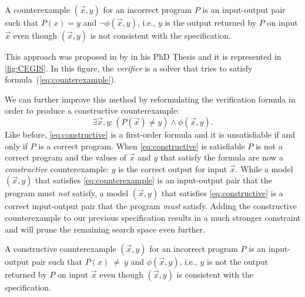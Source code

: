 \begin{definition}[Counterexample]
A counterexample \((\vec{x}, y)\) for an incorrect program \(P\) is an input-output pair such that \(P(x) = y\) and \(\neg \phi(\vec{x}, y)\), i.e., \(y\) is the output returned by \(P\) on input \(\vec{x}\) even though \((\vec{x}, y)\) is not consistent with the specification.
\end{definition}

This approach was proposed in \citeyear{Solar-LezamaPhDThesis} by \citeauthor{Solar-LezamaPhDThesis} in his PhD Thesis \cite{Solar-LezamaPhDThesis} and it is represented in \autoref{fig:CEGIS}. In this figure, the \textit{verifier} is a solver that tries to satisfy formula~(\ref{eq:counterexample}).

We can further improve this method by reformulating the verification formula in order to produce a constructive counterexample:
%
\begin{equation}\label{eq:constructive}
\exists \vec{x}, y : (P(\vec{x}) \neq y) \wedge \phi(\vec{x}, y).
\end{equation}
%
Like before, \eqref{eq:constructive} is a first-order formula and it is unsatisfiable if and only if \(P\) is a correct program.
When \eqref{eq:constructive} is satisfiable \(P\) is not a correct program and the values of \(\vec{x}\) and \(y\) that satisfy the formula are now a \textit{constructive} counterexample: \(y\) is the correct output for input \(\vec{x}\).
While a model \((\vec{x}, y)\) that satisfies \eqref{eq:counterexample} is an input-output pair that the program must \textit{not} satisfy, a model \((\vec{x}, y)\) that satisfies \eqref{eq:constructive} is a correct input-output pair that the program \textit{must} satisfy.
Adding the constructive counterexample to our previous specification results in a much stronger constraint and will prune the remaining search space even further. %

\begin{definition}
A constructive counterexample \((\vec{x}, y)\) for an incorrect program \(P\) is an input-output pair such that {{\(P(x)~\neq~y\)}} and \(\phi(\vec{x}, y)\), i.e., \(y\) is not the output returned by \(P\) on input \(\vec{x}\) even though \((\vec{x}, y)\) is consistent with the specification.
\end{definition}

